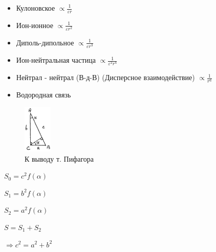 
\begin{lecture}
	\begin{lecSection}
	\begin{flushleft}	
		\begin{itemize}
			\item Кулоновское $\propto $\Large$\frac{1}{\varepsilon r}$ \normalsize	
			\item Ион-ионное $\propto $\Large$\frac{1}{\varepsilon r^2}$ \normalsize
			\item Диполь-дипольное $\propto$\Large$\frac{1}{\varepsilon r^3}$\normalsize
			\item Ион-нейтральная частица $\propto$\Large$\frac{1}{\varepsilon^2 r^4}$\normalsize
			\item Нейтрал - нейтрал (В-д-В) (Дисперсное взаимодействие) $\propto$\Large$\frac{1}{r^6}$\normalsize
			\item Водородная связь 
		\end{itemize}
	\end{flushleft}
	\end{lecSection}

	\begin{lecSection}

	\begin{figure}
    	\begin{center}
			\includegraphics[width=0.12\textwidth]{lecture_07/new_pic1}
     	\end{center}
     \caption{К выводу т. Пифагора}
	\end{figure}

	\par $S_0 = c^2 f(\alpha)$
	\par $S_1 = b^2 f(\alpha)$
	\par $S_2 = a^2 f(\alpha)$
	\par $S = S_1 + S_2$
	\par $\Rightarrow c^2 = a^2 + b^2$

	\end{lecSection}
	

\end{lecture}
